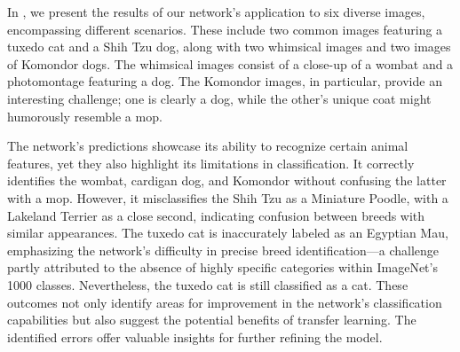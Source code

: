 In , we present the results of our network's application to six diverse images, encompassing different scenarios. These include two common images featuring a tuxedo cat and a Shih Tzu dog, along with two whimsical images and two images of Komondor dogs. The whimsical images consist of a close-up of a wombat and a photomontage featuring a dog. The Komondor images, in particular, provide an interesting challenge; one is clearly a dog, while the other's unique coat might humorously resemble a mop.

The network's predictions showcase its ability to recognize certain animal features, yet they also highlight its limitations in classification. It correctly identifies the wombat, cardigan dog, and Komondor without confusing the latter with a mop. However, it misclassifies the Shih Tzu as a Miniature Poodle, with a Lakeland Terrier as a close second, indicating confusion between breeds with similar appearances. The tuxedo cat is inaccurately labeled as an Egyptian Mau, emphasizing the network's difficulty in precise breed identification—a challenge partly attributed to the absence of highly specific categories within ImageNet's 1000 classes. Nevertheless, the tuxedo cat is still classified as a cat. These outcomes not only identify areas for improvement in the network's classification capabilities but also suggest the potential benefits of transfer learning. The identified errors offer valuable insights for further refining the model.


